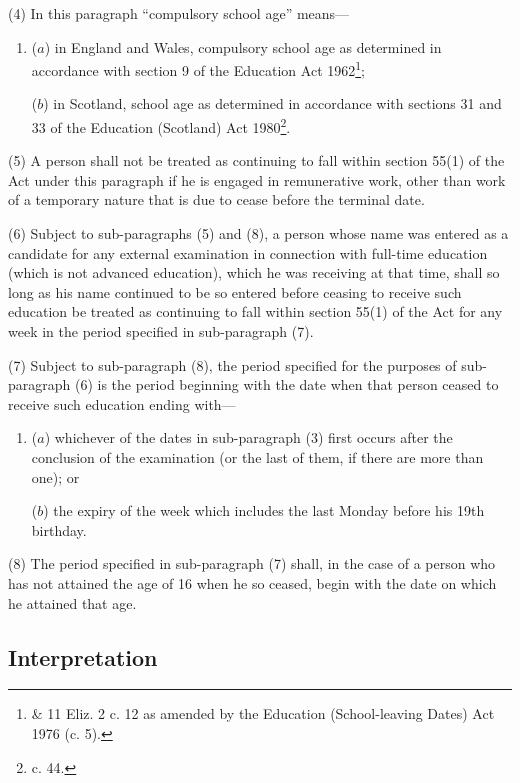 \documentclass[a4paper]{article}
\begin{document}
(4) In this paragraph “compulsory school age” means—
\begin{enumerate}\item[]
($a$) in England and Wales, compulsory school age as determined in accordance with section 9 of the Education Act 1962\footnote{ \& 11 Eliz. 2 c. 12 as amended by the Education (School-leaving Dates) Act 1976 (c. 5).};

($b$) in Scotland, school age as determined in accordance with sections 31 and 33 of the Education (Scotland) Act 1980\footnote{ c. 44.}.
\end{enumerate}

(5) A person shall not be treated as continuing to fall within section 55(1) of the Act under this paragraph if he is engaged in remunerative work, other than work of a temporary nature that is due to cease before the terminal date.

(6) Subject to sub-paragraphs (5) and (8), a person whose name was entered as a candidate for any external examination in connection with full-time education (which is not advanced education), which he was receiving at that time, shall so long as his name continued to be so entered before ceasing to receive such education be treated as continuing to fall within section 55(1) of the Act for any week in the period specified in sub-paragraph (7).

(7) Subject to sub-paragraph (8), the period specified for the purposes of sub-paragraph (6) is the period beginning with the date when that person ceased to receive such education ending with—
\begin{enumerate}\item[]
($a$) whichever of the dates in sub-paragraph (3) first occurs after the conclusion of the examination (or the last of them, if there are more than one); or

($b$) the expiry of the week which includes the last Monday before his 19th birthday.
\end{enumerate}

(8) The period specified in sub-paragraph (7) shall, in the case of a person who has not attained the age of 16 when he so ceased, begin with the date on which he attained that age.

\subsection*{Interpretation}
\end{document}
